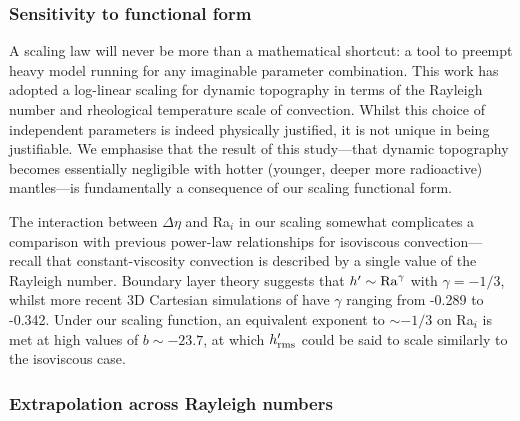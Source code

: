 \subsubsection{Sensitivity to functional form}

A scaling law will never be more than a mathematical shortcut: a tool to preempt heavy model running for any imaginable parameter combination. This work has adopted a log-linear scaling for dynamic topography in terms of the Rayleigh number and rheological temperature scale of convection. Whilst this choice of independent parameters is indeed physically justified, it is not unique in being justifiable. %
We emphasise that the result of this study---that dynamic topography becomes essentially negligible with hotter (younger, deeper more radioactive) mantles---is fundamentally a consequence of our scaling functional form.

The interaction between $\Delta \eta$ and Ra$_i$ in our scaling somewhat complicates a comparison with previous power-law relationships for isoviscous convection---recall that constant-viscosity convection is described by a single value of the Rayleigh number. Boundary layer theory suggests that $h^\prime \sim {\rm Ra}^\gamma$ \citep{mckenzie_convection_1974, parsons_relationship_1983} with $\gamma=-1/3$, whilst more recent 3D Cartesian simulations of \citet{lees_gravity_2020} have $\gamma$ ranging from -0.289 to -0.342. Under our scaling function, an equivalent exponent to $\sim -1/3$ on Ra$_i$ is met at high values of $b \sim -23.7$, at which $h_{\rm rms}^\prime$ could be said to scale similarly to the isoviscous case. 


\subsubsection{Extrapolation across Rayleigh numbers} \label{sec:discussion-extrap}


